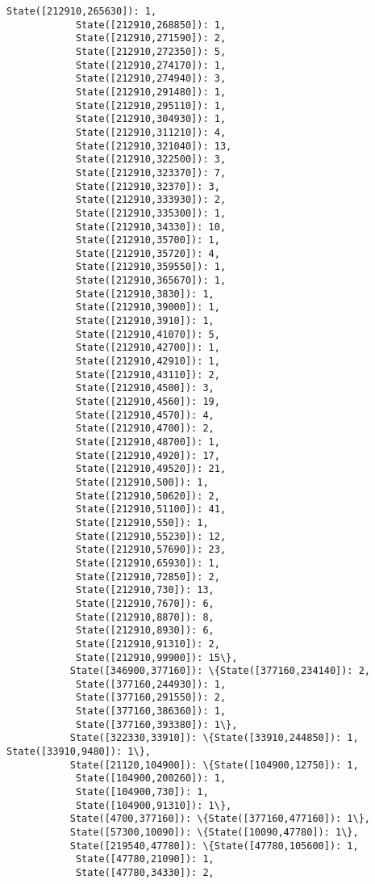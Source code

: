 \documentclass[11pt]{article}
\begin{document}
\begin{Verbatim}[commandchars=\\\{\}]
            State([212910,265630]): 1,
            State([212910,268850]): 1,
            State([212910,271590]): 2,
            State([212910,272350]): 5,
            State([212910,274170]): 1,
            State([212910,274940]): 3,
            State([212910,291480]): 1,
            State([212910,295110]): 1,
            State([212910,304930]): 1,
            State([212910,311210]): 4,
            State([212910,321040]): 13,
            State([212910,322500]): 3,
            State([212910,323370]): 7,
            State([212910,32370]): 3,
            State([212910,333930]): 2,
            State([212910,335300]): 1,
            State([212910,34330]): 10,
            State([212910,35700]): 1,
            State([212910,35720]): 4,
            State([212910,359550]): 1,
            State([212910,365670]): 1,
            State([212910,3830]): 1,
            State([212910,39000]): 1,
            State([212910,3910]): 1,
            State([212910,41070]): 5,
            State([212910,42700]): 1,
            State([212910,42910]): 1,
            State([212910,43110]): 2,
            State([212910,4500]): 3,
            State([212910,4560]): 19,
            State([212910,4570]): 4,
            State([212910,4700]): 2,
            State([212910,48700]): 1,
            State([212910,4920]): 17,
            State([212910,49520]): 21,
            State([212910,500]): 1,
            State([212910,50620]): 2,
            State([212910,51100]): 41,
            State([212910,550]): 1,
            State([212910,55230]): 12,
            State([212910,57690]): 23,
            State([212910,65930]): 1,
            State([212910,72850]): 2,
            State([212910,730]): 13,
            State([212910,7670]): 6,
            State([212910,8870]): 8,
            State([212910,8930]): 6,
            State([212910,91310]): 2,
            State([212910,99900]): 15\},
           State([346900,377160]): \{State([377160,234140]): 2,
            State([377160,244930]): 1,
            State([377160,291550]): 2,
            State([377160,386360]): 1,
            State([377160,393380]): 1\},
           State([322330,33910]): \{State([33910,244850]): 1, State([33910,9480]): 1\},
           State([21120,104900]): \{State([104900,12750]): 1,
            State([104900,200260]): 1,
            State([104900,730]): 1,
            State([104900,91310]): 1\},
           State([4700,377160]): \{State([377160,477160]): 1\},
           State([57300,10090]): \{State([10090,47780]): 1\},
           State([219540,47780]): \{State([47780,105600]): 1,
            State([47780,21090]): 1,
            State([47780,34330]): 2,

\end{Verbatim}
\end{document}
